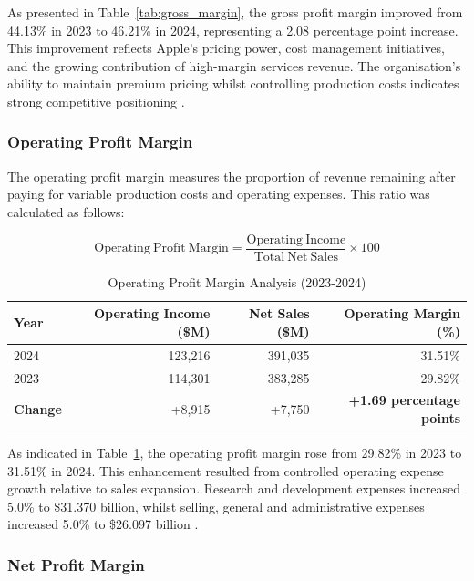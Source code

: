 \documentclass[12pt,a4paper]{article}
\begin{document}
As presented in Table~\ref{tab:gross_margin}, the gross profit margin improved from 44.13\% in 2023 to 46.21\% in 2024, representing a 2.08 percentage point increase. This improvement reflects Apple's pricing power, cost management initiatives, and the growing contribution of high-margin services revenue. The organisation's ability to maintain premium pricing whilst controlling production costs indicates strong competitive positioning \citep{apple202410k}.

\subsubsection{Operating Profit Margin}

The operating profit margin measures the proportion of revenue remaining after paying for variable production costs and operating expenses. This ratio was calculated as follows:

\begin{equation}
\mathrm{Operating\ Profit\ Margin} = \frac{\mathrm{Operating\ Income}}{\mathrm{Total\ Net\ Sales}} \times 100
\end{equation}

\begin{table}[H]
\centering
\caption{Operating Profit Margin Analysis (2023-2024)}
\label{tab:operating_margin}
\begin{tabular}{lrrr}
\toprule
\textbf{Year} & \textbf{Operating Income (\$M)} & \textbf{Net Sales (\$M)} & \textbf{Operating Margin (\%)} \\
\midrule
2024 & 123,216 & 391,035 & 31.51\% \\
2023 & 114,301 & 383,285 & 29.82\% \\
\textbf{Change} & +8,915 & +7,750 & \textbf{+1.69 percentage points} \\
\bottomrule
\end{tabular}
\end{table}

As indicated in Table~\ref{tab:operating_margin}, the operating profit margin rose from 29.82\% in 2023 to 31.51\% in 2024. This enhancement resulted from controlled operating expense growth relative to sales expansion. Research and development expenses increased 5.0\% to \$31.370 billion, whilst selling, general and administrative expenses increased 5.0\% to \$26.097 billion \citep{apple202410k}.

\subsubsection{Net Profit Margin}
\end{document}
